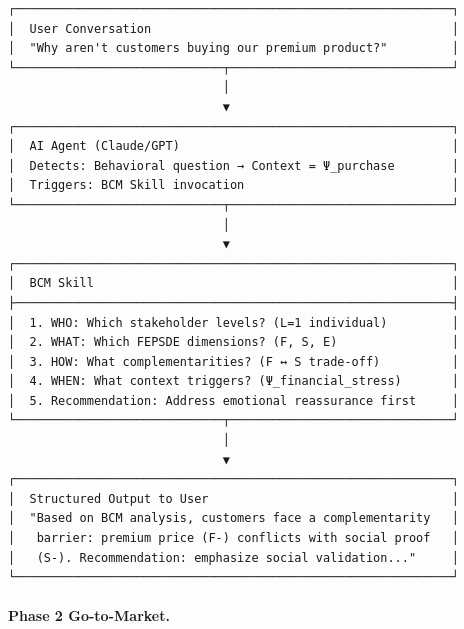 \begin{verbatim}
┌─────────────────────────────────────────────────────────────┐
│  User Conversation                                          │
│  "Why aren't customers buying our premium product?"         │
└─────────────────────────────┬───────────────────────────────┘
                              │
                              ▼
┌─────────────────────────────────────────────────────────────┐
│  AI Agent (Claude/GPT)                                      │
│  Detects: Behavioral question → Context = Ψ_purchase        │
│  Triggers: BCM Skill invocation                             │
└─────────────────────────────┬───────────────────────────────┘
                              │
                              ▼
┌─────────────────────────────────────────────────────────────┐
│  BCM Skill                                                  │
├─────────────────────────────────────────────────────────────┤
│  1. WHO: Which stakeholder levels? (L=1 individual)         │
│  2. WHAT: Which FEPSDE dimensions? (F, S, E)                │
│  3. HOW: What complementarities? (F ↔ S trade-off)          │
│  4. WHEN: What context triggers? (Ψ_financial_stress)       │
│  5. Recommendation: Address emotional reassurance first     │
└─────────────────────────────┬───────────────────────────────┘
                              │
                              ▼
┌─────────────────────────────────────────────────────────────┐
│  Structured Output to User                                  │
│  "Based on BCM analysis, customers face a complementarity   │
│   barrier: premium price (F-) conflicts with social proof   │
│   (S-). Recommendation: emphasize social validation..."     │
└─────────────────────────────────────────────────────────────┘
\end{verbatim}

\paragraph{Phase 2 Go-to-Market.}

